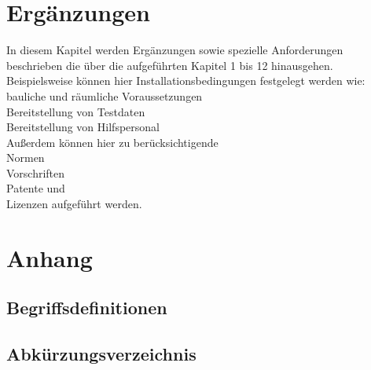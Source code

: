 \documentclass[a4paper,listof=leveldown,listof=numbered]{scrreprt}
\begin{document}
\chapter{Ergänzungen}	
	In diesem Kapitel werden Ergänzungen sowie spezielle Anforderungen beschrieben die über die aufgeführten Kapitel 1 bis 12 hinausgehen. Beispielsweise können hier Installationsbedingungen festgelegt werden wie:\\
	bauliche und räumliche Voraussetzungen\\
	Bereitstellung von Testdaten\\
	Bereitstellung von Hilfspersonal\\
	Außerdem können hier zu berücksichtigende\\
	Normen\\
	Vorschriften\\
	Patente und\\
	Lizenzen aufgeführt werden.
	
\chapter{Anhang}
\appendix
	\section{Begriffsdefinitionen}

	\section{Abkürzungsverzeichnis}
		\begin{acronym} 
		\end{acronym}
	
	\listoffigures
	
\end{document}
